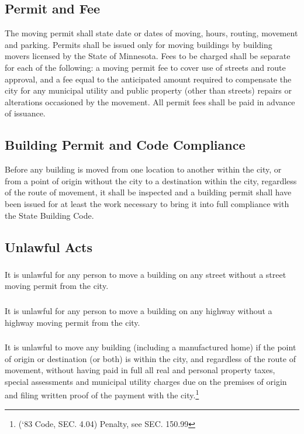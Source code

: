 \subsection{Permit and Fee}
The moving permit shall state date or dates of moving, hours, routing, movement and parking. Permits shall be issued only for moving buildings by building movers licensed by the State of Minnesota. Fees to be charged shall be separate for each of the following: a moving permit fee to cover use of streets and route approval, and a fee equal to the anticipated amount required to compensate the city for any municipal utility and public property (other than streets) repairs or alterations occasioned by the movement. All permit fees shall be paid in advance of issuance.
\subsection{Building Permit and Code Compliance}
Before any building is moved from one location to another within the city, or from a point of origin without the city to a destination within the city, regardless of the route of movement, it shall be inspected and a building permit shall have been issued for at least the work necessary to bring it into full compliance with the State Building Code.
\subsection{Unlawful Acts}
\subsubsection{}
It is unlawful for any person to move a building on any street without a street moving permit from the city.
\subsubsection{}
It is unlawful for any person to move a building on any highway without a highway moving permit from the city.
\subsubsection{}
It is unlawful to move any building (including a manufactured home) if the point of origin or destination (or both) is within the city, and regardless of the route of movement, without having paid in full all real and personal property taxes, special assessments and municipal utility charges due on the premises of origin and filing written proof of the payment with the city.\footnote{(‘83 Code, SEC. 4.04)  Penalty, see SEC. 150.99}
